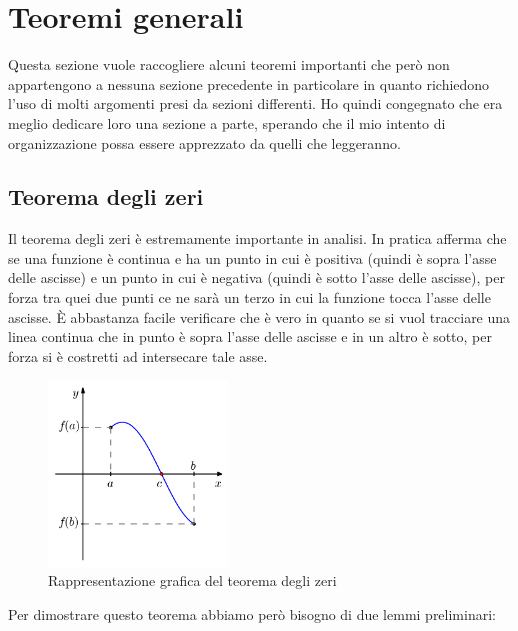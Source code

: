 \section{Teoremi generali}
Questa sezione vuole raccogliere alcuni teoremi importanti che però non appartengono a nessuna sezione precedente in particolare in quanto richiedono l'uso di molti argomenti presi da sezioni differenti. Ho quindi congegnato che era meglio dedicare loro una sezione a parte, sperando che il mio intento di organizzazione possa essere apprezzato da quelli che leggeranno.

\subsection{Teorema degli zeri}
Il teorema degli zeri è estremamente importante in analisi. In pratica afferma che se una funzione è continua e ha un punto in cui è positiva (quindi è sopra l'asse delle ascisse) e un punto in cui è negativa (quindi è sotto l'asse delle ascisse), per forza tra quei due punti ce ne sarà un terzo in cui la funzione tocca l'asse delle ascisse. È abbastanza facile verificare che è vero in quanto se si vuol tracciare una linea continua che in punto è sopra l'asse delle ascisse e in un altro è sotto, per forza si è costretti ad intersecare tale asse.
\begin{figure}[h]
    \centering
    \includegraphics[width=180px]{../img/TeoremaZeri.jpg}
    \caption{Rappresentazione grafica del teorema degli zeri}
\end{figure}
Per dimostrare questo teorema abbiamo però bisogno di due lemmi preliminari:

